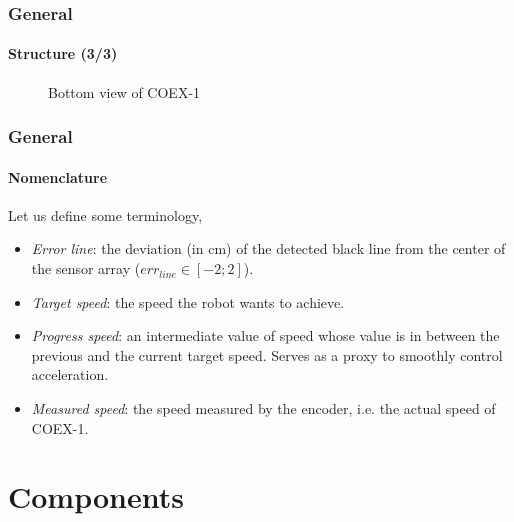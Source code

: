 \documentclass[10pt]{beamer}
\begin{document}

\begin{frame}
\frametitle{General}
\framesubtitle{Structure (3/3)}
\begin{figure}[hbtp]
\centering
{}
\caption{Bottom view of COEX-1}
\label{fig:fig-img-bottom}
\end{figure}
\end{frame}


\begin{frame}
\frametitle{General}
\framesubtitle{Nomenclature}
Let us define some terminology,
\begin{itemize}
\item \textit{Error line}: the deviation (in cm) of the detected black line from the center of the sensor array ($err_{line} \in [-2;2]$).
\item \textit{Target speed}: the speed the robot wants to achieve.
\item \textit{Progress speed}: an intermediate value of speed whose value is in between the previous and the current target speed. Serves as a proxy to smoothly control acceleration.
\item \textit{Measured speed}: the speed measured by the encoder, i.e. the actual speed of COEX-1.
\end{itemize}
\end{frame}

\section{Components} 
\end{document}
